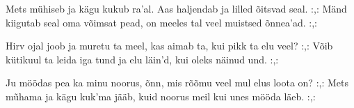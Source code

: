 Mets m\"uhiseb ja k\"agu kukub ra'al.
Aas haljendab ja lilled \~oitsvad seal.
:,: M\"and kiigutab seal oma v\~oimsat pead,
    on meeles tal veel muistsed \~onnea'ad. :,: 

Hirv ojal joob ja muretu ta meel,
kas aimab ta, kui pikk ta elu veel?
:,: V\~oib k\"utikuul ta leida iga tund
    ja elu l\"ain'd, kui oleks n\"ainud und. :,: 

Ju m\"o\"odas pea ka minu noorus, \~onn,
mis r\~o\~omu veel mul elus loota on?
:,: Mets m\~uhama ja k\"agu kuk'ma j\"a\"ab,
    kuid noorus meil kui unes m\"o\"oda l\"aeb. :,: 

